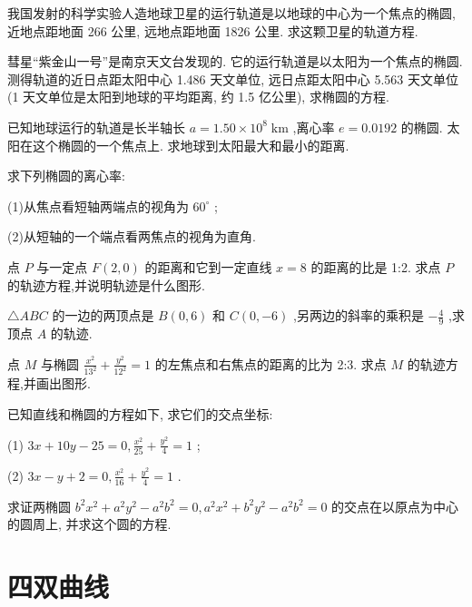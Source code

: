 \documentclass[lang=cn,newtx,12pt,scheme=chinese]{elegantbook}
\begin{document}
\begin{problemset}[习 题 六]
\item 我国发射的科学实验人造地球卫星的运行轨道是以地球的中心为一个焦点的椭圆, 近地点距地面 266 公里, 远地点距地面 1826 公里. 求这颗卫星的轨道方程.

\item 彗星“紫金山一号”是南京天文台发现的. 它的运行轨道是以太阳为一个焦点的椭圆. 测得轨道的近日点距太阳中心 1.486 天文单位, 远日点距太阳中心 5.563 天文单位 (1 天文单位是太阳到地球的平均距离, 约 1.5 亿公里), 求椭圆的方程.

\item 已知地球运行的轨道是长半轴长 \(a = {1.50} \times {10}^{8}\mathrm{\;{km}}\) ,离心率 \(e = {0.0192}\) 的椭圆. 太阳在这个椭圆的一个焦点上. 求地球到太阳最大和最小的距离.

\item 求下列椭圆的离心率:

(1)从焦点看短轴两端点的视角为 \({60}^{ \circ }\) ;

(2)从短轴的一个端点看两焦点的视角为直角.

\item 点 \(P\) 与一定点 \(F\left( {2,0}\right)\) 的距离和它到一定直线 \(x = 8\) 的距离的比是 1:2. 求点 \(P\) 的轨迹方程,并说明轨迹是什么图形.

\item \(\bigtriangleup {ABC}\) 的一边的两顶点是 \(B\left( {0,6}\right)\) 和 \(C\left( {0, - 6}\right)\) ,另两边的斜率的乘积是 \(- \frac{4}{9}\) ,求顶点 \(A\) 的轨迹.

\item 点 \(M\) 与椭圆 \(\frac{{x}^{2}}{{13}^{2}} + \frac{{y}^{2}}{{12}^{2}} = 1\) 的左焦点和右焦点的距离的比为 2:3. 求点 \(M\) 的轨迹方程,并画出图形.

\item 已知直线和椭圆的方程如下, 求它们的交点坐标:

(1) \({3x} + {10y} - {25} = 0,\frac{{x}^{2}}{25} + \frac{{y}^{2}}{4} = 1\) ;

(2) \({3x} - y + 2 = 0,\frac{{x}^{2}}{16} + \frac{{y}^{2}}{4} = 1\) .

\item 求证两椭圆 \({b}^{2}{x}^{2} + {a}^{2}{y}^{2} - {a}^{2}{b}^{2} = 0,{a}^{2}{x}^{2} + {b}^{2}{y}^{2} - {a}^{2}{b}^{2} = 0\) 的交点在以原点为中心的圆周上, 并求这个圆的方程.

\end{problemset}

\section*{四\text{ }双曲线}
\end{document}
